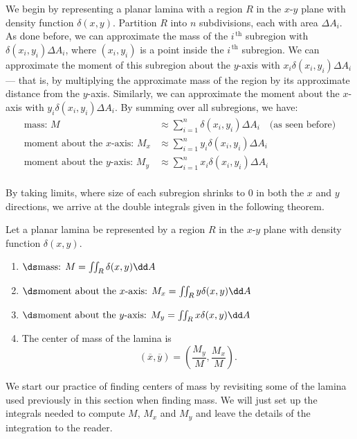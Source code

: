 We begin by representing a planar lamina with a region $R$ in the $x$-$y$ plane with density function $\delta(x,y)$. Partition $R$ into $n$ subdivisions, each with area $\Delta A_i$. As done before, we can approximate the mass of the $i^{\,\text{th}}$ subregion with $\delta(x_i,y_i)\Delta A_i$, where $(x_i,y_i)$ is a point inside the $i^{\,\text{th}}$ subregion. We can approximate the moment of this subregion about the $y$-axis with $x_i\delta(x_i,y_i)\Delta A_i$ --- that is, by multiplying the approximate mass of the region by its approximate distance from the $y$-axis. Similarly, we can approximate the moment about the $x$-axis with $y_i\delta(x_i,y_i)\Delta A_i$. By summing over all subregions, we have:
\begin{align*}
\text{mass: } M &\approx \sum_{i=1}^n \delta(x_i,y_i)\Delta A_i\quad \text{(as seen before)}\\
\text{moment about the $x$-axis: } M_x &\approx \sum_{i=1}^n y_i\delta(x_i,y_i)\Delta A_i\\
\text{moment about the $y$-axis: } M_y &\approx \sum_{i=1}^n x_i\delta(x_i,y_i)\Delta A_i\\
\end{align*}

By taking limits, where size of each subregion shrinks to 0 in both the $x$ and $y$ directions, we arrive at the double integrals given in the following theorem.

\begin{theorem}\label{thm:center_of_mass}
Let a planar lamina be represented by a region $R$ in the $x$-$y$ plane with density function $\delta(x,y)$. 
\begin{enumerate}
	\item $\ds \text{mass: } M = \iint_R\delta(x,y)\dd A$
	\item	$\ds \text{moment about the $x$-axis: } M_x = \iint_Ry\delta(x,y)\dd A$
	\item	$\ds \text{moment about the $y$-axis: } M_y = \iint_Rx\delta(x,y)\dd A$
	\item The center of mass  of the lamina is
	\[(\overline{x},\overline{y}) = \left(\frac{M_y}{M},\frac{M_x}M\right).\]
\end{enumerate}
\end{theorem}

We start our practice of finding centers of mass by revisiting some of the lamina used previously in this section when finding mass. We will  just set up the integrals needed to compute $M$, $M_x$ and $M_y$ and leave the details of the integration to the reader.

